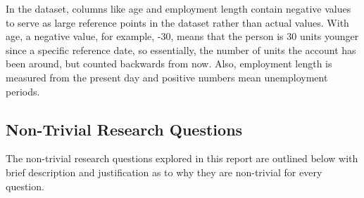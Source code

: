 \documentclass{article}\usepackage[]{graphicx}\usepackage[]{xcolor}
\begin{document}
In the dataset, columns like age and employment length contain negative values to serve as large reference points in the dataset rather than actual values. With age, a negative value, for example, -30, means that the person is 30 units younger since a specific reference date, so essentially, the number of units the account has been around, but counted backwards from now. Also, employment length is measured from the present day and positive numbers mean unemployment periods.

\subsection{Non-Trivial Research Questions}

The non-trivial research questions explored in this report are outlined below with brief description and justification as to why they are non-trivial for every question.\\
\end{document}
